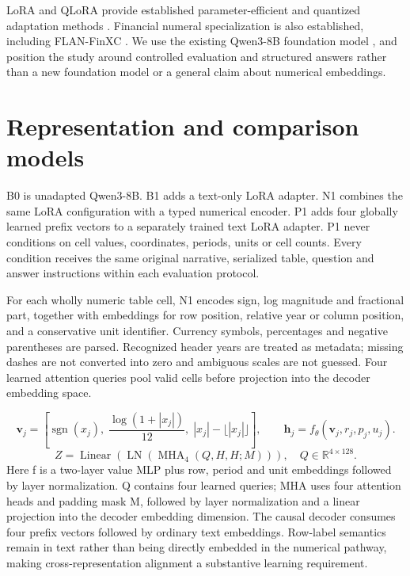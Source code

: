 \documentclass[11pt,a4paper]{article}
\begin{document}
LoRA and QLoRA provide established parameter-efficient and quantized adaptation methods \cite{r5,r6}. Financial numeral specialization is also established, including FLAN-FinXC \cite{r7}. We use the existing Qwen3-8B foundation model \cite{r8}, and position the study around controlled evaluation and structured answers rather than a new foundation model or a general claim about numerical embeddings.

\section{Representation and comparison models}
B0 is unadapted Qwen3-8B. B1 adds a text-only LoRA adapter. N1 combines the same LoRA configuration with a typed numerical encoder. P1 adds four globally learned prefix vectors to a separately trained text LoRA adapter. P1 never conditions on cell values, coordinates, periods, units or cell counts. Every condition receives the same original narrative, serialized table, question and answer instructions within each evaluation protocol.

For each wholly numeric table cell, N1 encodes sign, log magnitude and fractional part, together with embeddings for row position, relative year or column position, and a conservative unit identifier. Currency symbols, percentages and negative parentheses are parsed. Recognized header years are treated as metadata; missing dashes are not converted into zero and ambiguous scales are not guessed. Four learned attention queries pool valid cells before projection into the decoder embedding space.

\begin{equation}
\mathbf v_j=\left[\operatorname{sgn}(x_j),\;\frac{\log(1+|x_j|)}{12},\;|x_j|-\lfloor |x_j|\rfloor\right],\qquad
\mathbf h_j=f_\theta(\mathbf v_j,r_j,p_j,u_j).
\end{equation}
\begin{equation}
Z=\operatorname{Linear}\!\left(\operatorname{LN}\!\left(\operatorname{MHA}_{4}(Q,H,H;M)\right)\right),\quad Q\in\mathbb R^{4\times128}.
\end{equation}
Here f is a two-layer value MLP plus row, period and unit embeddings followed by layer normalization. Q contains four learned queries; MHA uses four attention heads and padding mask M, followed by layer normalization and a linear projection into the decoder embedding dimension. The causal decoder consumes four prefix vectors followed by ordinary text embeddings. Row-label semantics remain in text rather than being directly embedded in the numerical pathway, making cross-representation alignment a substantive learning requirement.
\end{document}
